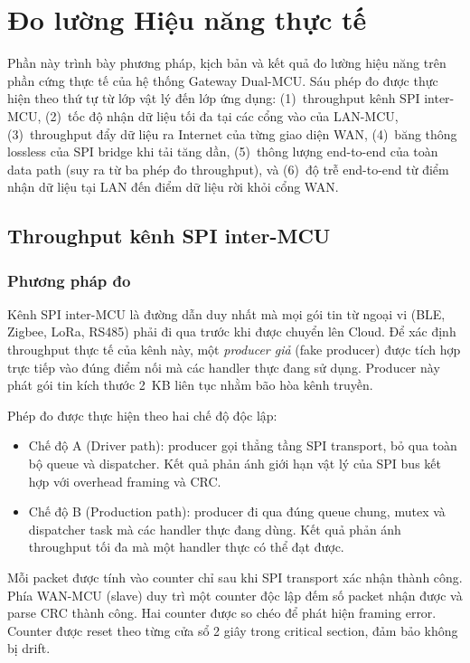 \section{Đo lường Hiệu năng thực tế}
\label{sec:benchmark}

Phần này trình bày phương pháp, kịch bản và kết quả đo lường hiệu năng trên phần cứng thực tế của hệ thống Gateway Dual-MCU. Sáu phép đo được thực hiện theo thứ tự từ lớp vật lý đến lớp ứng dụng: (1)~throughput kênh SPI inter-MCU, (2)~tốc độ nhận dữ liệu tối đa tại các cổng vào của LAN-MCU, (3)~throughput đẩy dữ liệu ra Internet của từng giao diện WAN, (4)~băng thông lossless của SPI bridge khi tải tăng dần, (5)~thông lượng end-to-end của toàn data path (suy ra từ ba phép đo throughput), và (6)~độ trễ end-to-end từ điểm nhận dữ liệu tại LAN đến điểm dữ liệu rời khỏi cổng WAN.

\subsection{Throughput kênh SPI inter-MCU}
\label{subsec:bench_spi}

\subsubsection{Phương pháp đo}

Kênh SPI inter-MCU là đường dẫn duy nhất mà mọi gói tin từ ngoại vi (BLE, Zigbee, LoRa, RS485) phải đi qua trước khi được chuyển lên Cloud. Để xác định throughput thực tế của kênh này, một \textit{producer giả} (fake producer) được tích hợp trực tiếp vào đúng điểm nối mà các handler thực đang sử dụng. Producer này phát gói tin kích thước 2~KB liên tục nhằm bão hòa kênh truyền.

Phép đo được thực hiện theo hai chế độ độc lập:

\begin{itemize}
    \item Chế độ A (Driver path): producer gọi thẳng tầng SPI transport, bỏ qua toàn bộ queue và dispatcher. Kết quả phản ánh giới hạn vật lý của SPI bus kết hợp với overhead framing và CRC.
    \item Chế độ B (Production path): producer đi qua đúng queue chung, mutex và dispatcher task mà các handler thực đang dùng. Kết quả phản ánh throughput tối đa mà một handler thực có thể đạt được.
\end{itemize}

Mỗi packet được tính vào counter chỉ sau khi SPI transport xác nhận thành công. Phía WAN-MCU (slave) duy trì một counter độc lập đếm số packet nhận được và parse CRC thành công. Hai counter được so chéo để phát hiện framing error. Counter được reset theo từng cửa sổ 2 giây trong critical section, đảm bảo không bị drift.

